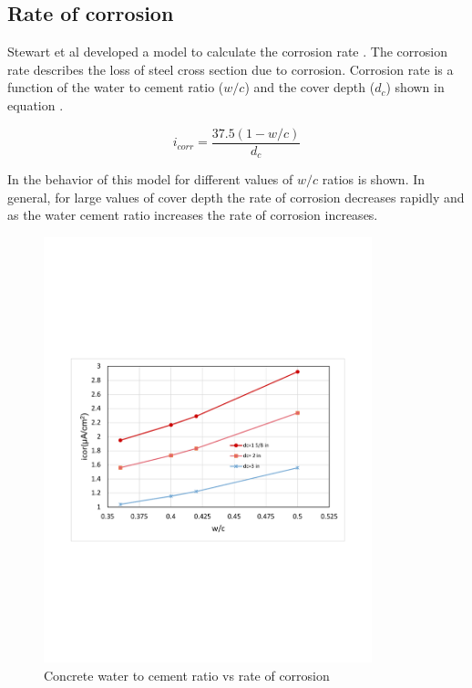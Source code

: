 \subsection{Rate of corrosion}

Stewart et al developed a model to calculate the corrosion rate  \cite{Vu2000}\cite{Stewart1998}. The corrosion rate describes the loss of steel cross section due to corrosion.   Corrosion rate is a function of the water to cement ratio ($w/c$) and the cover depth ($d_c$) shown in equation .


\begin{equation}
  i_{corr}=\frac{37.5(1-w/c)}{d_c}
  \label{eq.CorrosionRate}
\end{equation} 

In  the behavior of this model for different values of $w/c$ ratios is shown. In general, for large values of cover depth the rate of corrosion decreases rapidly and as the water cement ratio increases the rate of corrosion increases.
%
\begin{figure}[htbp]
\centering
\includegraphics[width=0.85\textwidth]{Chapter-2/figs/wc_icor}
\caption{Concrete water to cement ratio vs rate of corrosion}
\label{fig:hist1}
\end{figure}

